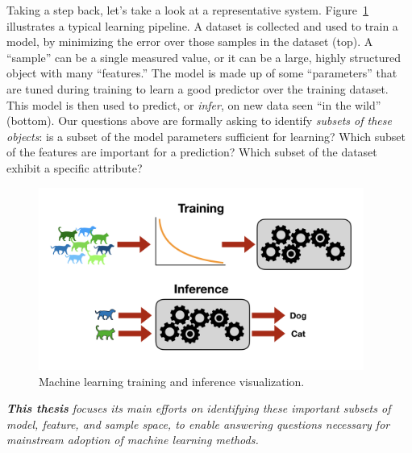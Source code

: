 Taking a step back, let's take a look at a representative system. Figure~\ref{fig:dl} illustrates a typical learning pipeline. 
A dataset is collected and used to train a model, by minimizing the error over
those samples in the dataset (top).
A ``sample'' can be a single measured value, or it can
be a large, highly structured object with many ``features.''
The model is made up of some ``parameters'' that are 
tuned during training to learn a good predictor over the training dataset.
This model is then used to predict, or \textit{infer}, on new
data seen ``in the wild'' (bottom).
Our questions above are formally asking to identify \textit{subsets of these objects}: is a subset of the model parameters sufficient for learning? Which subset of the features are important for a prediction? Which subset of the dataset exhibit a specific attribute?
\begin{figure}
    \centering
    \includegraphics[trim={0 3cm 0 3cm},clip,width=0.95\textwidth]{1_intro/figs/dl.png}
    \caption[Modern machine learning pipelines]{Machine learning training and inference visualization.}
    \label{fig:dl}
\end{figure}


\begin{mdframed}[style=MyFrame]
\em 
\textbf{This thesis} focuses its main efforts on identifying these important subsets of model, feature, and sample space, to enable answering questions necessary for mainstream adoption of machine learning methods.
\end{mdframed}

